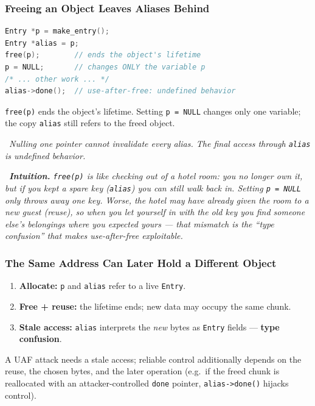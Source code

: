 \documentclass[hidelinks]{article}
\newcommand{\callout}[1]{\par\smallskip\noindent{\color{capri}$\blacktriangleright$}\ \textit{#1}\par\smallskip}
\begin{document}
\subsubsection{Freeing an Object Leaves Aliases Behind}

\begin{lstlisting}[language=C]
Entry *p = make_entry();
Entry *alias = p;
free(p);        // ends the object's lifetime
p = NULL;       // changes ONLY the variable p
/* ... other work ... */
alias->done();  // use-after-free: undefined behavior
\end{lstlisting}
\texttt{free(p)} ends the object's lifetime. Setting \texttt{p = NULL} changes only one variable; the copy \texttt{alias} still refers to the freed object.

\callout{Nulling one pointer cannot invalidate every alias. The final access through \texttt{alias} is undefined behavior.}

\callout{\textbf{Intuition.} \texttt{free(p)} is like checking out of a hotel room: you no longer own it, but if you kept a spare key (\texttt{alias}) you can still walk back in. Setting \texttt{p = NULL} only throws away \emph{one} key. Worse, the hotel may have already given the room to a new guest (reuse), so when you let yourself in with the old key you find someone else's belongings where you expected yours --- that mismatch is the ``type confusion'' that makes use-after-free exploitable.}

\subsubsection{The Same Address Can Later Hold a Different Object}

\begin{enumerate}
    \item \textbf{Allocate:} \texttt{p} and \texttt{alias} refer to a live \texttt{Entry}.
    \item \textbf{Free + reuse:} the lifetime ends; new data may occupy the same chunk.
    \item \textbf{Stale access:} \texttt{alias} interprets the \emph{new} bytes as \texttt{Entry} fields --- \textbf{type confusion}.
\end{enumerate}
A UAF attack needs a stale access; reliable control additionally depends on the reuse, the chosen bytes, and the later operation (e.g.\ if the freed chunk is reallocated with an attacker-controlled \texttt{done} pointer, \texttt{alias->done()} hijacks control).
\end{document}
